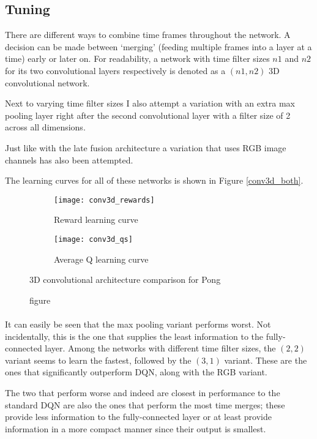 \subsection{Tuning}
\label{sub:conv3d_tuning}
There are different ways to combine time frames throughout the network.
A decision can be made between `merging'
(feeding multiple frames into a layer at a time)
early or later on.
For readability,
a network with time filter sizes
$n1$ and $n2$ for its two convolutional layers respectively
is denoted as a $(n1, n2)$ 3D convolutional network.

Next to varying time filter sizes
I also attempt a variation with an extra max pooling layer
right after the second convolutional layer
with a filter size of 2 across all dimensions.

Just like with the late fusion architecture
a variation that uses RGB image channels has also been attempted.

The learning curves for all of these networks
is shown in Figure \ref{conv3d_both}.

\begin{figure}[htpb]
  \centering
  \begin{subfigure}[t]{.49\linewidth}
    \caption{Reward learning curve}
    \texttt{[image: conv3d\_rewards]}
  \end{subfigure}
  \begin{subfigure}[t]{.49\linewidth}
    \caption{Average Q learning curve}
    \texttt{[image: conv3d\_qs]}
  \end{subfigure}
  \caption{figure}{
    3D convolutional architecture comparison for Pong
  }
  \label{fig:conv3d_both}
\end{figure}

\paragraph{}
It can easily be seen that the max pooling variant
performs worst.
Not incidentally,
this is the one that supplies the least information
to the fully-connected layer.
Among the networks with different time filter sizes,
the $(2,2)$ variant seems to learn the fastest,
followed by the $(3,1)$ variant.
These are the ones that significantly outperform DQN,
along with the RGB variant.

The two that perform worse and indeed
are closest in performance to the standard DQN
are also the ones that perform the most time merges;
these provide less information to the fully-connected layer
or at least provide information in a more compact manner
since their output is smallest.

